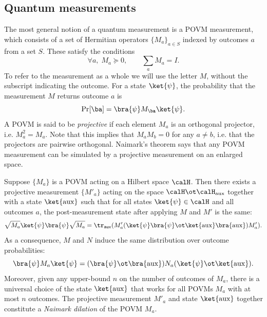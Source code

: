 \documentclass[11pt]{article}
\newcommand{\rmaux}{\mathrm{aux}}
\newcommand{\reg}[1]{{\mathsf{#1}}}
\begin{document}
\subsection{Quantum measurements}
The most general notion of a quantum measurement is a POVM
measurement, which consists of a set of Hermitian operators $\{M_a\}_{a \in S}$
indexed by outcomes $a$ from a set $S$. These satisfy the
conditions
\[ \forall a,\; M_a \succeq 0, \qquad \sum_a M_a = I. \]
To refer to the measurement as a whole
we will use the letter $M$, without the subscript indicating the
outcome. For a state $\ket{\psi}$, the
probability that the measurement $M$ returns outcome $a$ is
\[ \Pr[\ba] = \bra{\psi} M_{\ba} \ket{\psi}. \]
A POVM is said to be \emph{projective} if each element $M_a$ is an
orthogonal projector, i.e. $M_a^2 = M_a$. Note that this implies that
$M_a M_b = 0$ for any $a \neq b$, i.e. that the projectors are
pairwise orthogonal. Naimark's theorem says that any POVM measurement
can be simulated by a projective measurement on an enlarged space.
\begin{theorem}[Naimark]\label{thm:naimark}
  Suppose $\{M_a\}$ is a POVM acting on a Hilbert space $\calH$. Then
  there exists a projective measurement $\{M'_a\}$ acting on the space
  $\calH \ot \calH_{\rmaux}$ together with a state $\ket{\rmaux}$ such
  that for all states $\ket{\psi} \in \calH$ and all outcomes $a$, the
  post-measurement state after applying $M$ and $M'$ is the same:
  \begin{equation} \sqrt{M_a} \ket{\psi}\bra{\psi} \sqrt{M_a} = \tr_{\reg{aux}}(M'_a (\ket{\psi}\bra{\psi}
    \ot \ket{\rmaux}\bra{\rmaux})M'_a). \label{eq:naimark}\end{equation}
  As a consequence, $M$ and $N$ induce the same distribution over
  outcome probabilities:
  \[ \bra{\psi} M_a \ket{\psi} = (\bra{\psi} \ot \bra{\rmaux}) N_a
    (\ket{\psi} \ot \ket{\rmaux}). \]
  Moreover, given any upper-bound $n$ on the number of outcomes of
  $M_a$, there is a universal choice of the state $\ket{\rmaux}$ that
  works for all POVMs $M_a$ with at most $n$ outcomes. The projective measurement
  $M'_a$ and state $\ket{\rmaux}$ together constitute a \emph{Naimark
    dilation} of the POVM $M_a$.
\end{theorem}
\end{document}
